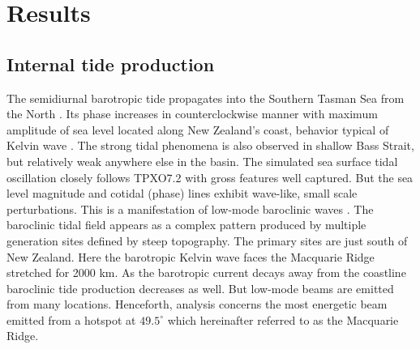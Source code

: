 \documentclass[12pt]{article}
\begin{document}
\section{Results}
\subsection{Internal tide production}
The semidiurnal barotropic tide propagates into the Southern Tasman Sea from the North 
. Its phase increases in counterclockwise manner with maximum amplitude of sea 
level located along New Zealand's coast, behavior typical of Kelvin wave \citep{walters2001ocean}. 
The strong tidal phenomena is also observed in shallow Bass Strait, but relatively weak anywhere 
else in the basin. The simulated sea surface tidal oscillation closely follows TPXO7.2 with gross 
features well captured. But the sea level magnitude and cotidal (phase) lines exhibit wave-like, 
small scale perturbations. This is a manifestation of low-mode baroclinic waves 
. The baroclinic tidal field appears as a complex pattern produced by 
multiple generation sites defined by steep topography. The primary sites are just south of 
New Zealand. Here the barotropic Kelvin wave faces the Macquarie Ridge stretched for 2000 km. As 
the barotropic current decays away from the coastline baroclinic tide production decreases as well. 
But low-mode beams are emitted from many locations. Henceforth, analysis concerns the 
most energetic beam emitted from a hotspot at $49.5^{\circ}$ which hereinafter referred to as the 
Macquarie Ridge.\\
\end{document}
